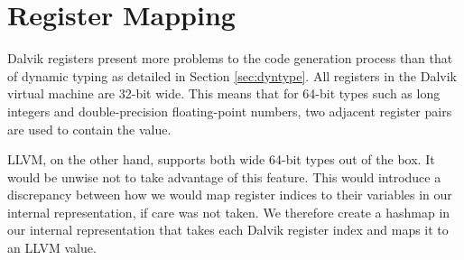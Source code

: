 \section{Register Mapping}
\label{sec:regmap}

Dalvik registers present more problems to the code generation process than that of dynamic typing as detailed in Section \ref{sec:dyntype}. All registers in the Dalvik virtual machine are 32-bit wide. This means that for 64-bit types such as long integers and double-precision floating-point numbers, two adjacent register pairs are used to contain the value.

LLVM, on the other hand, supports both wide 64-bit types out of the box. It would be unwise not to take advantage of this feature. This would introduce a discrepancy between how we would map register indices to their variables in our internal representation, if care was not taken. We therefore create a hashmap in our internal representation that takes each Dalvik register index and maps it to an LLVM value.
